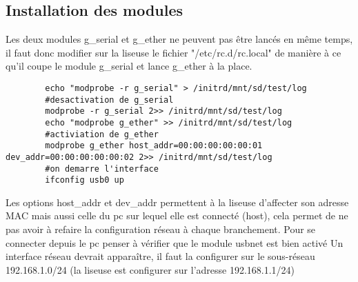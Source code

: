 \subsection{Installation des modules}	
	Les deux modules g_serial et g_ether ne peuvent pas être lancés en même temps, il faut donc modifier sur la liseuse le fichier "/etc/rc.d/rc.local" de manière à ce qu'il coupe le module g_serial et lance g_ether à la place.
	\begin{verbatim}
		echo "modprobe -r g_serial" > /initrd/mnt/sd/test/log
		#desactivation de g_serial
		modprobe -r g_serial 2>> /initrd/mnt/sd/test/log
		echo "modprobe g_ether" >> /initrd/mnt/sd/test/log
		#activiation de g_ether
		modprobe g_ether host_addr=00:00:00:00:00:01 dev_addr=00:00:00:00:00:02 2>> /initrd/mnt/sd/test/log
		#on demarre l'interface
		ifconfig usb0 up
	\end{verbatim}
	Les options host_addr et dev_addr permettent à la liseuse d'affecter son adresse MAC mais aussi celle du pc sur lequel elle est connecté (host), cela permet de ne pas avoir à refaire la configuration réseau à chaque branchement.	
	Pour se connecter depuis le pc penser à vérifier que le module usbnet est bien activé	
	Un interface réseau devrait apparaître, il faut la configurer sur le sous-réseau 192.168.1.0/24 (la liseuse est configurer sur l'adresse 192.168.1.1/24)
	